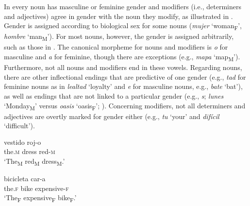 \documentclass[output=paper,colorlinks,citecolor=brown,modfonts,nonflat]{../langscibook}
\begin{document}
In  every noun has masculine or feminine gender and modifiers (i.e., determiners and adjectives) agree in gender with the noun they modify, as illustrated in . Gender is assigned according to biological sex for some nouns (\textit{mujer} ‘woman\textsubscript{F}’, \textit{hombre} ‘man\textsubscript{M}’). For most nouns, however, the gender is assigned arbitrarily, such as those in . The canonical morpheme for nouns and modifiers is \textit{o} for masculine and \textit{a} for feminine, though there are exceptions (e.g., \textit{mapa}\textsubscript{} ‘map\textsubscript{M}’). Furthermore, not all nouns and modifiers end in these vowels. Regarding nouns, there are other inflectional endings that are predictive of one gender (e.g., \textit{tad} for feminine nouns as in \textit{lealtad} ‘loyalty’ and \textit{e} for masculine nouns, e.g., \textit{bate} ‘bat’), as well as endings that are not linked to a particular gender (e.g., \textit{s}; \textit{lunes} ‘Monday\textsubscript{M}’ versus \textit{oasis} ‘oasis\textsubscript{F}’; \citealt{TeschnerRussell1984}). Concerning modifiers, not all determiners and adjectives are overtly marked for gender either (e.g., \textit{tu} ‘your’ and \textit{difícil} ‘difficult’).


\ea\label{ex:gudmestad:1}
\ea
{} {vestido} {roj-o}\\
     the.\textsc{m} dress red-\textsc{m}\\
\glt ‘The\textsubscript{M} red\textsubscript{M} dress\textsubscript{M}.’

\ex
{} {bicicleta} {car-a}\\
    the.\textsc{f} bike expensive-\textsc{f}\\
\glt    ‘The\textsubscript{F} expensive\textsubscript{F} bike\textsubscript{F}.’
\z
\z
\end{document}
